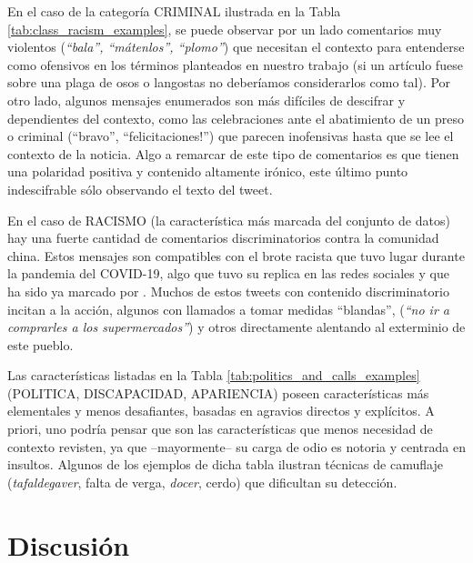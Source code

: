 En el caso de la categoría CRIMINAL ilustrada en la Tabla \ref{tab:class_racism_examples}, se puede observar por un lado comentarios muy violentos (\emph{``bala'', ``mátenlos'', ``plomo''}) que necesitan el contexto para entenderse como ofensivos en los términos planteados en nuestro trabajo (si un artículo fuese sobre una plaga de osos o langostas no deberíamos considerarlos como tal). Por otro lado, algunos mensajes enumerados son más difíciles de descifrar y dependientes del contexto, como las celebraciones ante el abatimiento de un preso o criminal (``bravo'', ``felicitaciones!'') que parecen inofensivas hasta que se lee el contexto de la noticia. Algo a remarcar de este tipo de comentarios es que tienen una polaridad positiva y contenido altamente irónico, este último punto indescifrable sólo observando el texto del tweet.

En el caso de RACISMO (la característica más marcada del conjunto de datos) hay una fuerte cantidad de comentarios discriminatorios contra la comunidad china. Estos mensajes son compatibles con el brote racista que tuvo lugar durante la pandemia del COVID-19, algo que tuvo su replica en las redes sociales y que ha sido ya marcado por \citet{he2021racism}. Muchos de estos tweets con contenido discriminatorio incitan a la acción, algunos con llamados a tomar medidas ``blandas'', (\emph{``no ir a comprarles a los supermercados''}) y otros directamente alentando al exterminio de este pueblo.

Las características listadas en la Tabla \ref{tab:politics_and_calls_examples} (POLITICA, DISCAPACIDAD, APARIENCIA) poseen características más elementales y menos desafiantes, basadas en agravios directos y explícitos. A priori, uno podría pensar que son las características que menos necesidad de contexto revisten, ya que --mayormente-- su carga de odio es notoria y centrada en insultos. Algunos de los ejemplos de dicha tabla ilustran técnicas de camuflaje (\emph{tafaldegaver}, falta de verga, \emph{docer}, cerdo) que dificultan su detección.


\section{Discusión}


